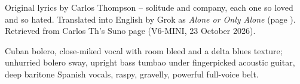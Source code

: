 
\label{sec:soledad-y-compania}
\begin{notes}
Original lyrics by Carlos Thompson -- solitude and company, each one so loved and so hated. Translated into English by Grok as \emph{Alone or Only Alone} (page \pageref{sec:alone-or-only-alone}). Retrieved from Carlos Th's Suno page (V6-MINI, 23 October 2026).
\end{notes}
\begin{style}
Cuban bolero, close-miked vocal with room bleed and a delta blues texture; unhurried bolero sway, upright bass tumbao under fingerpicked acoustic guitar, deep baritone Spanish vocals, raspy, gravelly, powerful full-voice belt.
\end{style}
